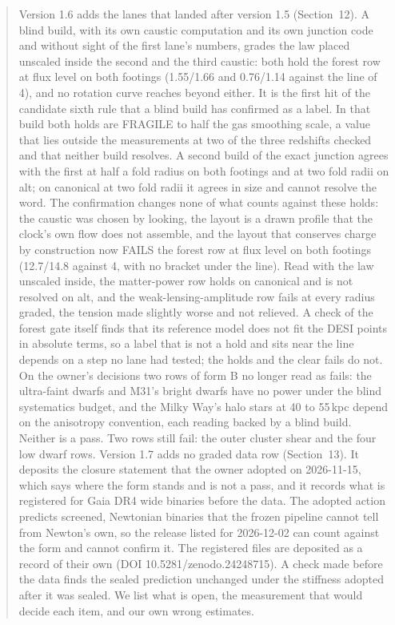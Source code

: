 \documentclass[10pt]{article}
\begin{document}
\begin{abstract}
Version 1.6 adds the lanes that landed after version 1.5 (Section~12). A blind build, with its own caustic computation and its own junction code and without sight of the first lane's numbers, grades the law placed unscaled inside the second and the third caustic: both hold the forest row at flux level on both footings (1.55/1.66 and 0.76/1.14 against the line of 4), and no rotation curve reaches beyond either. It is the first hit of the candidate sixth rule that a blind build has confirmed as a label. In that build both holds are FRAGILE to half the gas smoothing scale, a value that lies outside the measurements at two of the three redshifts checked and that neither build resolves. A second build of the exact junction agrees with the first at half a fold radius on both footings and at two fold radii on alt; on canonical at two fold radii it agrees in size and cannot resolve the word. The confirmation changes none of what counts against these holds: the caustic was chosen by looking, the layout is a drawn profile that the clock's own flow does not assemble, and the layout that conserves charge by construction now FAILS the forest row at flux level on both footings (12.7/14.8 against 4, with no bracket under the line). Read with the law unscaled inside, the matter-power row holds on canonical and is not resolved on alt, and the weak-lensing-amplitude row fails at every radius graded, the tension made slightly worse and not relieved. A check of the forest gate itself finds that its reference model does not fit the DESI points in absolute terms, so a label that is not a hold and sits near the line depends on a step no lane had tested; the holds and the clear fails do not. On the owner's decisions two rows of form B no longer read as fails: the ultra-faint dwarfs and M31's bright dwarfs have no power under the blind systematics budget, and the Milky Way's halo stars at 40 to 55\,kpc depend on the anisotropy convention, each reading backed by a blind build. Neither is a pass. Two rows still fail: the outer cluster shear and the four low dwarf rows.
Version 1.7 adds no graded data row (Section~13). It deposits the closure statement that the owner adopted on 2026-11-15, which says where the form stands and is not a pass, and it records what is registered for Gaia DR4 wide binaries before the data. The adopted action predicts screened, Newtonian binaries that the frozen pipeline cannot tell from Newton's own, so the release listed for 2026-12-02 can count against the form and cannot confirm it. The registered files are deposited as a record of their own (DOI 10.5281/zenodo.24248715). A check made before the data finds the sealed prediction unchanged under the stiffness adopted after it was sealed.
We list what is open, the measurement that would decide each item, and our own wrong estimates.
\end{abstract}
\end{document}
